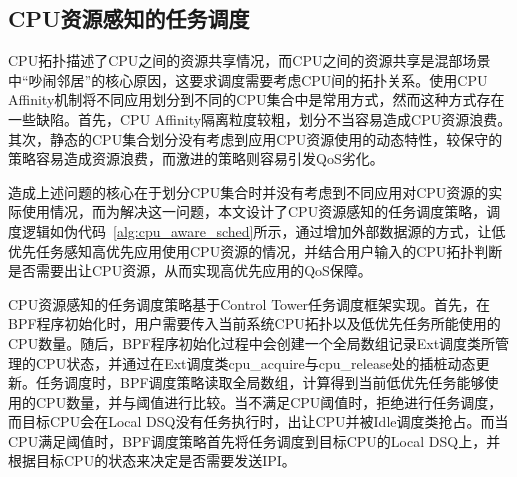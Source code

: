 

\subsection{CPU资源感知的任务调度} 


CPU拓扑描述了CPU之间的资源共享情况，而CPU之间的资源共享是混部场景中“吵闹邻居”的核心原因，这要求调度需要考虑CPU间的拓扑关系。使用CPU Affinity机制将不同应用划分到不同的CPU集合中是常用方式，然而这种方式存在一些缺陷。首先，CPU Affinity隔离粒度较粗，划分不当容易造成CPU资源浪费。其次，静态的CPU集合划分没有考虑到应用CPU资源使用的动态特性，较保守的策略容易造成资源浪费，而激进的策略则容易引发QoS劣化。

造成上述问题的核心在于划分CPU集合时并没有考虑到不同应用对CPU资源的实际使用情况，而为解决这一问题，本文设计了CPU资源感知的任务调度策略，调度逻辑如伪代码~\ref{alg:cpu_aware_sched}所示，通过增加外部数据源的方式，让低优先任务感知高优先应用使用CPU资源的情况，并结合用户输入的CPU拓扑判断是否需要出让CPU资源，从而实现高优先应用的QoS保障。

CPU资源感知的任务调度策略基于Control Tower任务调度框架实现。首先，在BPF程序初始化时，用户需要传入当前系统CPU拓扑以及低优先任务所能使用的CPU数量。随后，BPF程序初始化过程中会创建一个全局数组记录Ext调度类所管理的CPU状态，并通过在Ext调度类cpu\_acquire与cpu\_release处的插桩动态更新。任务调度时，BPF调度策略读取全局数组，计算得到当前低优先任务能够使用的CPU数量，并与阈值进行比较。当不满足CPU阈值时，拒绝进行任务调度，而目标CPU会在Local DSQ没有任务执行时，出让CPU并被Idle调度类抢占。而当CPU满足阈值时，BPF调度策略首先将任务调度到目标CPU的Local DSQ上，并根据目标CPU的状态来决定是否需要发送IPI。

